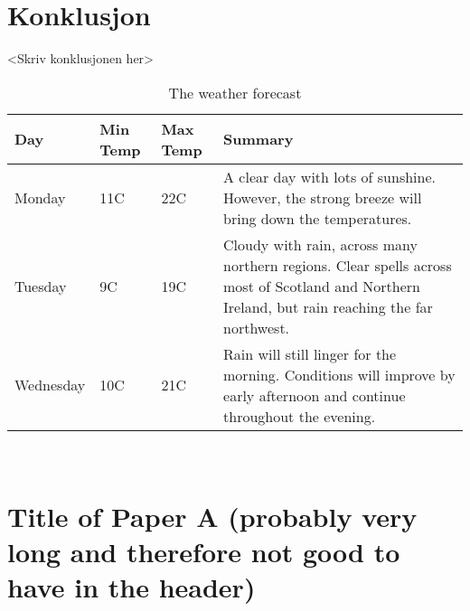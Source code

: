 \documentclass[%
norsk,  %
]{USN-BSc}
\begin{document}
\chapter{Konklusjon}
\label{sec:konklusjon}
<Skriv konklusjonen her>

\begin{table}[!ht]
 \caption{The weather forecast}
  \centering
   \begin{tabular}{| l | l | l | p{5cm} |}
    \hline
    Day & Min Temp & Max Temp & Summary \\ \hline
    Monday & 11C & 22C & A clear day with lots of sunshine.
    However, the strong breeze will bring down the temperatures. \\ \hline
    Tuesday & 9C & 19C & Cloudy with rain, across many northern regions. Clear spells
    across most of Scotland and Northern Ireland,
    but rain reaching the far northwest. \\ \hline
    Wednesday & 10C & 21C & Rain will still linger for the morning.
    Conditions will improve by early afternoon and continue
    throughout the evening. \\
    \hline
    \end{tabular}
\end{table}


~\nocite{*}

\cleardoublepage

\printbibliography[heading=bibintoc]


\appendix



\chapter[Short Title of Paper A]{Title of Paper A (probably very long and therefore not good to have in the header)}
\label{paper-a}
\end{document}
